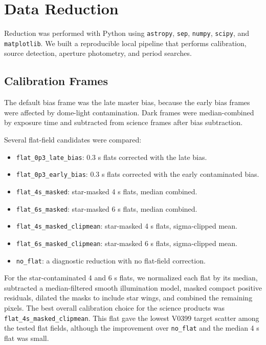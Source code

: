 \documentclass[11pt]{article}
\begin{document}
\section{Data Reduction}

Reduction was performed with Python using \texttt{astropy}, \texttt{sep},
\texttt{numpy}, \texttt{scipy}, and \texttt{matplotlib}. We built a reproducible
local pipeline that performs calibration, source detection, aperture photometry,
and period searches.

\subsection{Calibration Frames}

The default bias frame was the late master bias, because the early bias frames
were affected by dome-light contamination. Dark frames were median-combined by
exposure time and subtracted from science frames after bias subtraction.

Several flat-field candidates were compared:
\begin{itemize}
  \item \texttt{flat\_0p3\_late\_bias}: 0.3 s flats corrected with the late bias.
  \item \texttt{flat\_0p3\_early\_bias}: 0.3 s flats corrected with the early contaminated bias.
  \item \texttt{flat\_4s\_masked}: star-masked 4 s flats, median combined.
  \item \texttt{flat\_6s\_masked}: star-masked 6 s flats, median combined.
  \item \texttt{flat\_4s\_masked\_clipmean}: star-masked 4 s flats, sigma-clipped mean.
  \item \texttt{flat\_6s\_masked\_clipmean}: star-masked 6 s flats, sigma-clipped mean.
  \item \texttt{no\_flat}: a diagnostic reduction with no flat-field correction.
\end{itemize}

For the star-contaminated 4 and 6 s flats, we normalized each flat by its median,
subtracted a median-filtered smooth illumination model, masked compact positive
residuals, dilated the masks to include star wings, and combined the remaining
pixels. The best overall calibration choice for the science products was
\texttt{flat\_4s\_masked\_clipmean}. This flat gave the lowest V0399 target
scatter among the tested flat fields, although the improvement over
\texttt{no\_flat} and the median 4 s flat was small.
\end{document}
